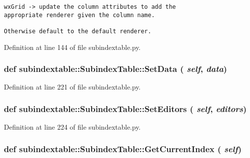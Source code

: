 \footnotesize\begin{verbatim}
wxGrid -> update the column attributes to add the
appropriate renderer given the column name.

Otherwise default to the default renderer.
\end{verbatim}
\normalsize
 

Definition at line 144 of file subindextable.py.\hypertarget{classsubindextable_1_1SubindexTable_b3b87639c5b4973204a7004dfe779f61}{
\subsubsection[SetData]{\setlength{\rightskip}{0pt plus 5cm}def subindextable::Subindex\-Table::Set\-Data ( {\em self},  {\em data})}}
\label{classsubindextable_1_1SubindexTable_b3b87639c5b4973204a7004dfe779f61}




Definition at line 221 of file subindextable.py.\hypertarget{classsubindextable_1_1SubindexTable_fe11dbf7566e5d5bbb9fa496e2cd252e}{
\subsubsection[SetEditors]{\setlength{\rightskip}{0pt plus 5cm}def subindextable::Subindex\-Table::Set\-Editors ( {\em self},  {\em editors})}}
\label{classsubindextable_1_1SubindexTable_fe11dbf7566e5d5bbb9fa496e2cd252e}




Definition at line 224 of file subindextable.py.\hypertarget{classsubindextable_1_1SubindexTable_077e9fd84d8def000462c611f9b2032a}{
\subsubsection[GetCurrentIndex]{\setlength{\rightskip}{0pt plus 5cm}def subindextable::Subindex\-Table::Get\-Current\-Index ( {\em self})}}
\label{classsubindextable_1_1SubindexTable_077e9fd84d8def000462c611f9b2032a}




